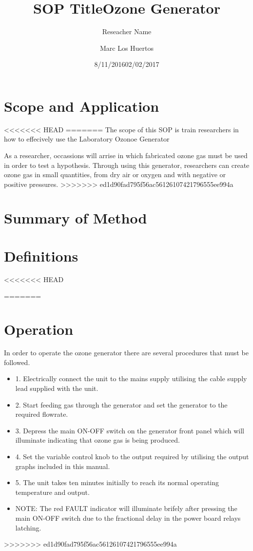 \documentclass[12pt]{../SOP2}
\title{SOP Title}
\date{8/11/2016}
\author{Reseacher Name}
\title{Ozone Generator}
\date{02/02/2017}
\author{Marc Los Huertos}
\begin{document}


\maketitle

\section{Scope and Application}

<<<<<<< HEAD
\NP \blindtext
=======
\NP The scope of this SOP is train researchers in how to effecively use the Laboratory Ozonoe Generator 

\NP As a researcher, occassions will arrise in which fabricated ozone gas must be used in order to test a hypothesis. Through using this generator, researchers can create ozone gas in small quantities, from dry air or oxygen and with negative or positive pressures. 
>>>>>>> ed1d90fad795f56ac56126107421796555ee994a

\section{Summary of Method}

\section{Definitions}

<<<<<<< HEAD
\NP \lipsum[1]

=======
\section{Operation}


\NP In order to operate the ozone generator there are several procedures that must be followed.

\begin{itemize}
  \item 1. Electrically connect the unit to the mains supply utilising the cable supply lead supplied with the unit.
  \item 2. Start feeding gas through the generator and set the generator to the required flowrate.
  \item 3. Depress the main ON-OFF switch on the generator front panel which will illuminate indicating that ozone gas is being produced.
  \item 4. Set the variable control knob to the output required by utilising the output graphs included in this manual.
  \item 5. The unit takes ten minutes initially to reach its normal operating temperature and output. 
  \item NOTE: The red FAULT indicator will illuminate brifely after pressing the main ON-OFF switch due to the fractional delay in the power board relays latching.
\end{itemize}
>>>>>>> ed1d90fad795f56ac56126107421796555ee994a
\end{document}
